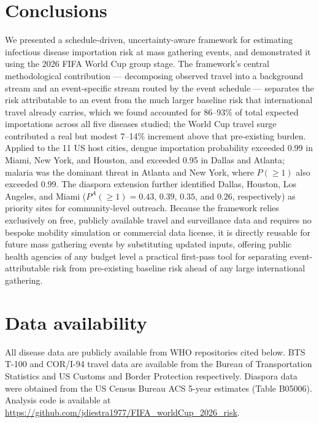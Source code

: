\documentclass[12pt, a4paper]{article}
\begin{document}
\section{Conclusions}

We presented a schedule-driven, uncertainty-aware framework for estimating infectious disease importation risk at mass gathering events, and demonstrated it using the 2026 FIFA World Cup group stage. The framework's central methodological contribution --- decomposing observed travel into a background stream and an event-specific stream routed by the event schedule --- separates the risk attributable to an event from the much larger baseline risk that international travel already carries, which we found accounted for 86--93\% of total expected importations across all five diseases studied; the World Cup travel surge contributed a real but modest 7--14\% increment above that pre-existing burden. Applied to the 11 US host cities, dengue importation probability exceeded 0.99 in Miami, New York, and Houston, and exceeded 0.95 in Dallas and Atlanta; malaria was the dominant threat in Atlanta and New York, where $P(\geq 1)$ also exceeded 0.99. The diaspora extension further identified Dallas, Houston, Los Angeles, and Miami ($P^A(\geq 1) = 0.43$, $0.39$, $0.35$, and $0.26$, respectively) as priority sites for community-level outreach. Because the framework relies exclusively on free, publicly available travel and surveillance data and requires no bespoke mobility simulation or commercial data license, it is directly reusable for future mass gathering events by substituting updated inputs, offering public health agencies of any budget level a practical first-pass tool for separating event-attributable risk from pre-existing baseline risk ahead of any large international gathering.

\section*{Data availability}
All disease data are publicly available from WHO repositories cited
below. BTS T-100 and COR/I-94 travel data are available from the
Bureau of Transportation Statistics and US Customs and Border
Protection respectively. Diaspora data were obtained from the
US Census Bureau ACS 5-year estimates (Table B05006).
Analysis code is available at \url{https://github.com/jdiestra1977/FIFA\_worldCup\_2026\_risk}.
\end{document}
